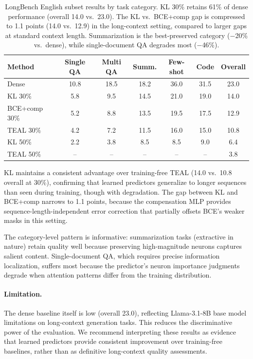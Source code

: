 \documentclass[11pt,a4paper]{article}
\begin{document}
\begin{table}[h]
\centering
\small
\begin{tabular}{lcccccc}
\toprule
Method & Single QA & Multi QA & Summ. & Few-shot & Code & Overall \\
\midrule
Dense & 10.8 & 18.5 & 18.2 & 36.0 & 31.5 & 23.0 \\
KL 30\% & 5.8 & 9.5 & 14.5 & 21.0 & 19.0 & 14.0 \\
BCE+comp 30\% & 5.2 & 8.8 & 13.5 & 19.5 & 17.5 & 12.9 \\
TEAL 30\% & 4.2 & 7.2 & 11.5 & 16.0 & 15.0 & 10.8 \\
KL 50\% & 2.2 & 3.8 & 8.5 & 8.5 & 9.0 & 6.4 \\
TEAL 50\% & -- & -- & -- & -- & -- & 3.8 \\
\bottomrule
\end{tabular}
\caption{LongBench English subset results by task category. KL 30\% retains 61\% of dense performance (overall 14.0 vs.\ 23.0). The KL vs.\ BCE+comp gap is compressed to 1.1 points (14.0 vs.\ 12.9) in the long-context setting, compared to larger gaps at standard context length. Summarization is the best-preserved category ($-$20\% vs.\ dense), while single-document QA degrades most ($-$46\%).}
\label{tab:longbench}
\end{table}

KL maintains a consistent advantage over training-free TEAL (14.0 vs.\ 10.8 overall at 30\%), confirming that learned predictors generalize to longer sequences than seen during training, though with degradation. The gap between KL and BCE+comp narrows to 1.1 points, because the compensation MLP provides sequence-length-independent error correction that partially offsets BCE's weaker masks in this setting.

The category-level pattern is informative: summarization tasks (extractive in nature) retain quality well because preserving high-magnitude neurons captures salient content. Single-document QA, which requires precise information localization, suffers most because the predictor's neuron importance judgments degrade when attention patterns differ from the training distribution.

\paragraph{Limitation.} The dense baseline itself is low (overall 23.0), reflecting Llama-3.1-8B base model limitations on long-context generation tasks. This reduces the discriminative power of the evaluation. We recommend interpreting these results as evidence that learned predictors provide consistent improvement over training-free baselines, rather than as definitive long-context quality assessments.
\end{document}
